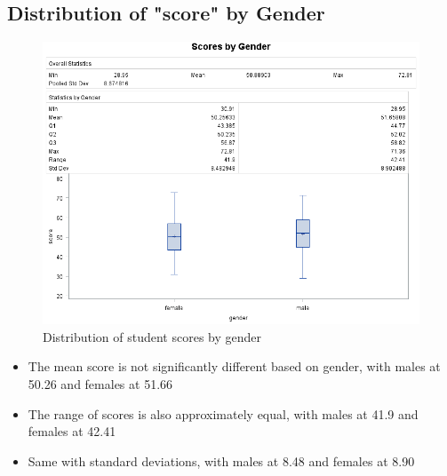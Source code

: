 \documentclass[12pt]{article}
\begin{document}
\subsection{Distribution of "score" by Gender}
\begin{figure}[h]
    \centering
    \includegraphics[width=1.14\textwidth]{images/scores_by_gender.png}
    \caption{Distribution of student scores by gender}
    \label{fig:scores_by_gender}
\end{figure}

\begin{itemize}
    \item The mean score is not significantly different based on gender, with males at 50.26 and females at 51.66
    \item The range of scores is also approximately equal, with males at 41.9 and females at 42.41
    \item Same with standard deviations, with males at 8.48 and females at 8.90
\end{itemize}
\newpage
\end{document}

